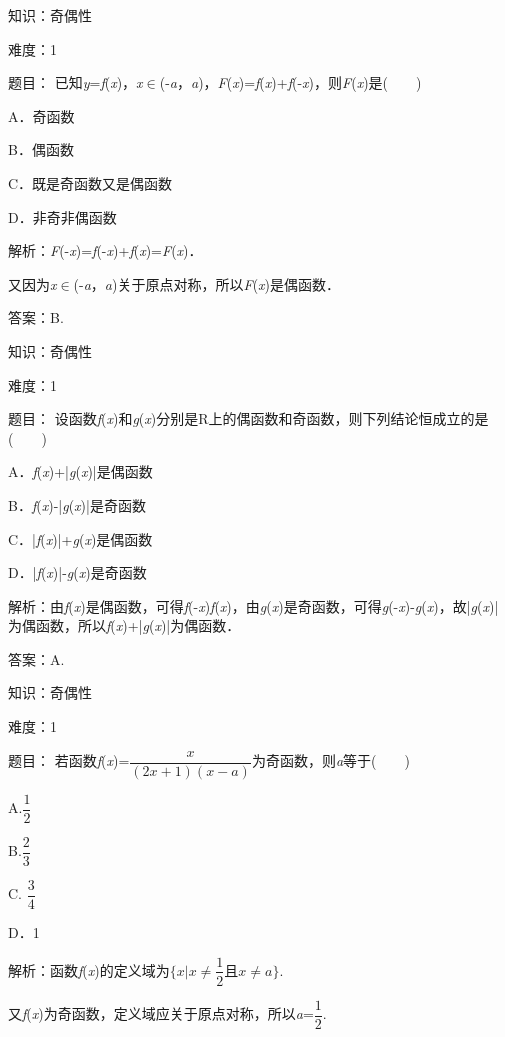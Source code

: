 \documentclass{article} %
\begin{document}
知识：奇偶性

难度：1

题目：
已知\textit{y}=\textit{f}(\textit{x})，\textit{x}$\mathrm{\in}$(-\textit{a}，\textit{a})，\textit{F}(\textit{x})=\textit{f}(\textit{x})+\textit{f}(-\textit{x})，则\textit{F}(\textit{x})是(　　)

A．奇函数    

B．偶函数

C．既是奇函数又是偶函数 

D．非奇非偶函数

解析：\textit{F}(-\textit{x})=\textit{f}(-\textit{x})+\textit{f}(\textit{x})=\textit{F}(\textit{x})．

又因为\textit{x}$\mathrm{\in}$(-\textit{a}，\textit{a})关于原点对称，所以\textit{F}(\textit{x})是偶函数．

答案：B.

知识：奇偶性

难度：1

题目：
设函数\textit{f}(\textit{x})和\textit{g}(\textit{x})分别是R上的偶函数和奇函数，则下列结论恒成立的是(　　)

A．\textit{f}(\textit{x})+|\textit{g}(\textit{x})|是偶函数  

B．\textit{f}(\textit{x})-|\textit{g}(\textit{x})|是奇函数

C．|\textit{f}(\textit{x})|+\textit{g}(\textit{x})是偶函数  

D．|\textit{f}(\textit{x})|-\textit{g}(\textit{x})是奇函数

解析：由\textit{f}(\textit{x})是偶函数，可得\textit{f}(-\textit{x})\textit{f}(\textit{x})，由\textit{g}(\textit{x})是奇函数，可得\textit{g}(-\textit{x})-\textit{g}(\textit{x})，故|\textit{g}(\textit{x})|为偶函数，所以\textit{f}(\textit{x})+|\textit{g}(\textit{x})|为偶函数．

答案：A.

知识：奇偶性

难度：1

题目：
若函数\textit{f}(\textit{x})=$\dfrac{x}{(2x+1)(x-a)}$为奇函数，则\textit{a}等于(　　)

A.$\dfrac{1}{2}$

B.$\dfrac{2}{3}$

C. $\dfrac{3}{4}$  

D．1

解析：函数\textit{f}(\textit{x})的定义域为$\{x|x\neq \dfrac{1}{2} 且  x\neq a\}$.

又\textit{f}(\textit{x})为奇函数，定义域应关于原点对称，所以\textit{a}=$\dfrac{1}{2}$.
\end{document}
